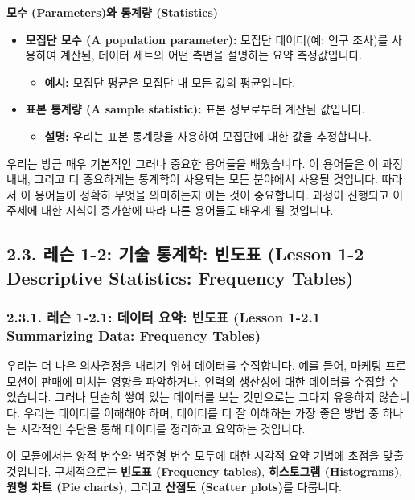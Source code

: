 \documentclass[11pt,a4paper]{article}
\theoremstyle{definition}
\begin{document}
\begin{summarybox}
\textbf{모수 (Parameters)와 통계량 (Statistics)}
\begin{itemize}
    \item \textbf{모집단 모수 (A population parameter):} 모집단 데이터(예: 인구 조사)를 사용하여 계산된, 데이터 세트의 어떤 측면을 설명하는 요약 측정값입니다.
    \begin{itemize}
        \item \textbf{예시:} 모집단 평균은 모집단 내 모든 값의 평균입니다.
    \end{itemize}
    \item \textbf{표본 통계량 (A sample statistic):} 표본 정보로부터 계산된 값입니다.
    \begin{itemize}
        \item \textbf{설명:} 우리는 표본 통계량을 사용하여 모집단에 대한 값을 추정합니다.
    \end{itemize}
\end{itemize}
\end{summarybox}
우리는 방금 매우 기본적인 그러나 중요한 용어들을 배웠습니다. 이 용어들은 이 과정 내내, 그리고 더 중요하게는 통계학이 사용되는 모든 분야에서 사용될 것입니다. 따라서 이 용어들이 정확히 무엇을 의미하는지 아는 것이 중요합니다. 과정이 진행되고 이 주제에 대한 지식이 증가함에 따라 다른 용어들도 배우게 될 것입니다.

\newpage
\subsection{2.3. 레슨 1-2: 기술 통계학: 빈도표 (Lesson 1-2 Descriptive Statistics: Frequency Tables)}

\subsubsection{2.3.1. 레슨 1-2.1: 데이터 요약: 빈도표 (Lesson 1-2.1 Summarizing Data: Frequency Tables)}

\begin{tcolorbox}[title={데이터 요약 (Summarizing Data)}]
우리는 더 나은 의사결정을 내리기 위해 데이터를 수집합니다. 예를 들어, 마케팅 프로모션이 판매에 미치는 영향을 파악하거나, 인력의 생산성에 대한 데이터를 수집할 수 있습니다. 그러나 단순히 쌓여 있는 데이터를 보는 것만으로는 그다지 유용하지 않습니다. 우리는 데이터를 이해해야 하며, 데이터를 더 잘 이해하는 가장 좋은 방법 중 하나는 시각적인 수단을 통해 데이터를 정리하고 요약하는 것입니다.

이 모듈에서는 양적 변수와 범주형 변수 모두에 대한 시각적 요약 기법에 초점을 맞출 것입니다. 구체적으로는 \textbf{빈도표 (Frequency tables)}, \textbf{히스토그램 (Histograms)}, \textbf{원형 차트 (Pie charts)}, 그리고 \textbf{산점도 (Scatter plots)}를 다룹니다.
\end{tcolorbox}
\end{document}
